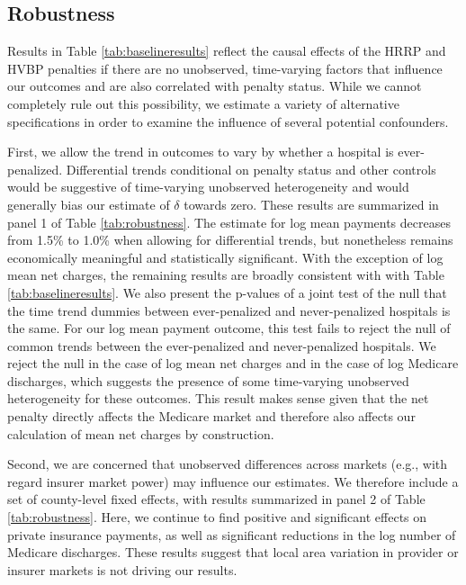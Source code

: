 \documentclass[12pt]{article}
\begin{document}
\subsection{Robustness}
Results in Table \ref{tab:baselineresults} reflect the causal effects of the HRRP and HVBP penalties if there are no unobserved, time-varying factors that influence our outcomes and are also correlated with penalty status.  While we cannot completely rule out this possibility, we estimate a variety of alternative specifications in order to examine the influence of several potential confounders.

First, we allow the trend in outcomes to vary by whether a hospital is ever-penalized. Differential trends conditional on penalty status and other controls would be suggestive of time-varying unobserved heterogeneity and would generally bias our estimate of $\delta$ towards zero.  These results are summarized in panel 1 of Table \ref{tab:robustness}. The estimate for log mean payments decreases from 1.5\% to 1.0\% when allowing for differential trends, but nonetheless remains economically meaningful and statistically significant. With the exception of log mean net charges, the remaining results are broadly consistent with with Table \ref{tab:baselineresults}. We also present the p-values of a joint test of the null that the time trend dummies between ever-penalized and never-penalized hospitals is the same. For our log mean payment outcome, this test fails to reject the null of common trends between the ever-penalized and never-penalized hospitals. We reject the null in the case of log mean net charges and in the case of log Medicare discharges, which suggests the presence of some time-varying unobserved heterogeneity for these outcomes. This result makes sense given that the net penalty directly affects the Medicare market and therefore also affects our calculation of mean net charges by construction.

Second, we are concerned that unobserved differences across markets (e.g., with regard insurer market power) may influence our estimates. We therefore include a set of county-level fixed effects, with results summarized in panel 2 of Table \ref{tab:robustness}. Here, we continue to find positive and significant effects on private insurance payments, as well as significant reductions in the log number of Medicare discharges. These results suggest that local area variation in provider or insurer markets is not driving our results.
\end{document}
